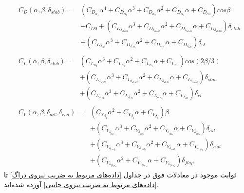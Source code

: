 \begin{equation}
\begin{split}
&\begin{split}
C_{D}(\alpha,\beta,\delta_{stab})= &(C_{D_{\alpha_{4}}}\alpha^{4}+C_{D_{\alpha_{3}}}\alpha^{3}+C_{D_{\alpha_{2}}}\alpha^{2}
+C_{D_{\alpha_{1}}}\alpha +C_{D_{\alpha0}})cos\beta  \\
&+C_{D0}+(C_{D_{\delta_{stab3}}}\alpha^{3}+C_{D_{\delta_{stab2}}}\alpha^{2}
+C_{D_{\delta_{stab1}}}\alpha +C_{D_{\delta_{stab0}}})\delta_{stab}\\
&+(C_{D_{\delta_{el3}}}\alpha^{3}+C_{D_{\delta_{el2}}}\alpha^{2}
+C_{D_{\delta_{el1}}}\alpha +C_{D_{\delta_{el0}}})\delta_{el}
\end{split} \\
&\begin{split}
C_{L}(\alpha,\beta,\delta_{stab})= &(C_{L_{\alpha_{3}}}\alpha^{3}+C_{L_{\alpha_{2}}}\alpha^{2}
+C_{L_{\alpha_{1}}}\alpha +C_{L_{\alpha0}})cos(2\beta  /3 ) \\
&+(C_{L_{\delta_{stab3}}}\alpha^{3}+C_{L_{\delta_{stab2}}}\alpha^{2}
+C_{L_{\delta_{stab1}}}\alpha +C_{L_{\delta_{stab0}}})\delta_{stab}\\
&+(C_{L_{\delta_{el3}}}\alpha^{3}+C_{L_{\delta_{el2}}}\alpha^{2}
+C_{L_{\delta_{el1}}}\alpha +C_{L_{\delta_{el0}}})\delta_{el}
\end{split} \\
&\begin{split}
C_{Y}(\alpha,\beta,\delta_{ail},\delta_{rud})=&(C_{Y_{\beta_{2}}}\alpha^{2}+C_{Y_{\beta_{1}}}\alpha +C_{Y_{\beta_{0}}})\beta \\
&+(C_{Y_{\delta_{ail_{3}}}}\alpha^{3}+C_{Y_{\delta_{ail_{2}}}}\alpha^{2}+C_{Y_{\delta_{ail_{1}}}}\alpha + C_{Y_{\delta_{ail_{0}}}})\delta_{ail}\\
&+(C_{Y_{\delta_{rud_{3}}}}\alpha^{3}+C_{Y_{\delta_{rud_{2}}}}\alpha^{2}+C_{Y_{\delta_{rud_{1}}}}\alpha + C_{Y_{\delta_{rud_{0}}}})\delta_{rud}\\
&+(C_{Y_{\delta_{flap_{2}}}}\alpha^{2}+C_{Y_{\delta_{flap_{1}}}}\alpha + C_{Y_{\delta_{flap_{0}}}})\delta_{flap}
\end{split}
\end{split}
\end{equation}
ثوابت موجود در معادلات فوق در جداول \ref{داده‌های مربوط به ضریب نیروی دراگ} تا  \ref{داده‌های مربوط به ضریب نیروی جانبی} آورده شده‌اند.
